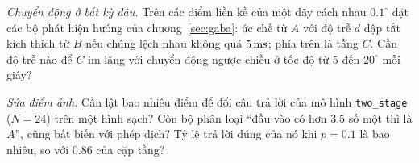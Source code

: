 \begin{exercise}[\lvlB]
\label{ex:12:7}
\emph{Chuyển động ở bất kỳ đâu.} Trên các điểm liền kề của một dãy cách nhau $0.1^\circ$ đặt các bộ phát hiện hướng của chương~\ref{sec:gaba}: ức chế từ $A$ với độ trễ $d$ dập tắt kích thích từ $B$ nếu chúng lệch nhau không quá $5\,\text{ms}$; phía trên là tầng $C$. Cần độ trễ nào để $C$ im lặng với chuyển động ngược chiều ở tốc độ từ $5$ đến $20^\circ$ mỗi giây?
\end{exercise}

\begin{exercise}[\lvlC]
\label{ex:12:8}
\emph{Sửa điểm ảnh.} Cần lật bao nhiêu điểm để đổi câu trả lời của mô hình \texttt{two\_stage} ($N=24$) trên một hình sạch? Còn bộ phân loại ``đầu vào có hơn $3.5$ số một thì là $A$'', cũng bất biến với phép dịch? Tỷ lệ trả lời đúng của nó khi $p=0.1$ là bao nhiêu, so với $0.86$ của cặp tầng?
\end{exercise}

